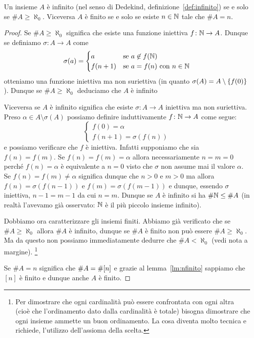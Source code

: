 \begin{theorem}
Un insieme $A$ è infinito (nel senso di Dedekind, definizione~\ref{def:infinito})
se e solo se $\# A \ge \aleph_0$.
Viceversa $A$ è finito se e solo se esiste $n\in{\mathbb N}$ tale che $\# A = n$.
\end{theorem}
%
\begin{proof}
Se $\#A \ge \aleph_0$ significa che esiste una funzione 
iniettiva $f\colon {\mathbb N}\to A$. 
Dunque se definiamo $\sigma \colon A \to A$ come
\[
\sigma(a) = \begin{cases}
  a & \text{se $a\not\in f({\mathbb N})$}\\
  f(n+1) & \text{se $a=f(n)$ con $n\in{\mathbb N}$}
\end{cases}
\]
otteniamo una funzione iniettiva ma non suriettiva 
(in quanto $\sigma(A) = A\setminus{\left\{ f(0) \right\}}$).
Dunque se $\#A\ge \aleph_0$ deduciamo che $A$ è infinito

Viceversa se $A$ è infinito significa che esiste $\sigma\colon A \to A$ 
iniettiva ma non suriettiva. 
Preso $\alpha \in A \setminus\sigma(A)$
possiamo definire induttivamente $f\colon {\mathbb N}\to A$ come segue:
\[
\begin{cases}
  f(0) = \alpha\\
  f(n+1) = \sigma(f(n))
\end{cases}
\]
e possiamo verificare che $f$ è iniettiva. 
Infatti supponiamo che sia $f(n)=f(m)$.
Se $f(n)=f(m)=\alpha$ allora necessariamente $n=m=0$ 
perché $f(n)=\alpha$ è equivalente a $n=0$ visto che $\sigma$
non assume mai il valore $\alpha$.
Se $f(n)=f(m)\neq \alpha$ significa dunque che $n>0$ e $m>0$
ma allora $f(n)=\sigma(f(n-1))$ e $f(m)=\sigma(f(m-1))$
e dunque, essendo $\sigma$ iniettiva, $n-1=m-1$ da cui $n=m$. 
Dunque se $A$ è infinito si ha $\#{\mathbb N}\le \#A$
(in realtà l'avevamo già osservato: ${\mathbb N}$ è il più piccolo insieme infinito).

Dobbiamo ora caratterizzare gli insiemi finiti.
Abbiamo già verificato che se $\#A \ge \aleph_0$ 
allora $\#A$ è infinito, dunque se $\#A$ è finito 
non può essere $\#A \ge \aleph_0$.
Ma da questo non possiamo immediatamente 
dedurre che $\#A < \aleph_0$ (vedi nota a margine).%
\footnote{%
Per dimostrare che ogni cardinalità può essere confrontata 
con ogni altra (cioè che l'ordinamento dato dalla cardinalità è totale) 
bisogna dimostrare che ogni insieme ammette un buon 
ordinamento. La cosa diventa molto tecnica e richiede,
l'utilizzo dell'assioma della scelta.
}%

Se $\#A = n$ significa che $\#A = \#{\left[ n \right]}$ e 
grazie al lemma~\ref{lm:nfinito} sappiamo che $[n]$ è finito 
e dunque anche $A$ è finito.


\end{proof}
